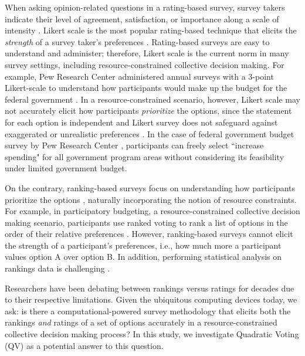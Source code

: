 When asking opinion-related questions in a rating-based survey, survey takers indicate their level of agreement, satisfaction, or importance along a scale of intensity \cite{moors2016two}. Likert scale is the most popular rating-based technique that elicits the \textit{strength} of a survey taker's preferences \cite{likert1932technique}. Rating-based surveys are easy to understand and administer; therefore, Likert scale is the current norm in many survey settings, including resource-constrained collective decision making. For example, Pew Research Center administered annual surveys with a 3-point Likert-scale to understand how participants would make up the budget for the federal government \cite{pew_spending}. In a resource-constrained scenario, however, Likert scale may not accurately elicit how participants \textit{prioritize} the options, since the statement for each option is independent \cite{alwin1985measurement} and Likert survey does not safeguard against exaggerated or unrealistic preferences \cite{araujo2017much, vavreck2007exaggerated}. In the case of federal government budget survey by Pew Research Center \cite{pew_spending}, participants can freely select ``increase spending" for all government program areas without considering its feasibility under limited government budget.

On the contrary, ranking-based surveys focus on understanding how participants prioritize the options \cite{moors2016two}, naturally incorporating the notion of resource constraints. For example, in participatory budgeting, a resource-constrained collective decision making scenario, participants use ranked voting to rank a list of options in the order of their relative preferences \cite{benade2020preference}. However, ranking-based surveys cannot elicit the strength of a participant's preferences, i.e., how much more a participant values option A over option B. In addition, performing statistical analysis on rankings data is challenging \cite{alwin1985measurement}.

Researchers have been debating between rankings versus ratings for decades due to their respective limitations. Given the ubiquitous computing devices today, we ask: is there a computational-powered survey methodology that elicits both the rankings \textit{and} ratings of a set of options accurately in a resource-constrained collective decision making process? In this study, we investigate Quadratic Voting (QV) \cite{posner2018radical} as a potential answer to this question. 

